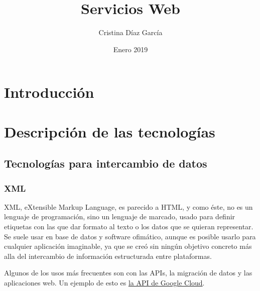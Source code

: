 \documentclass{article}
\title{Servicios Web}
\author{Cristina Díaz García}
\date{Enero 2019}
\begin{document}

\begin{titlingpage}
\maketitle
\end{titlingpage}

\newpage

\tableofcontents

\newpage

\section{Introducción}


\section{Descripción de las tecnologías}

\subsection{Tecnologías para intercambio de datos}

\subsubsection{XML}

XML, eXtensible Markup Language, es parecido a HTML, y como éste, no es un lenguaje de programación, sino un lenguaje de marcado, usado para definir etiquetas con las que dar formato al texto o los datos que se quieran representar. Se suele usar en base de datos y software ofimático, aunque es posible usarlo para cualquier aplicación imaginable, ya que se creó sin ningún objetivo concreto más alla del intercambio de información estructurada entre plataformas.

Algunos de los usos más frecuentes son con las APIs, la migración de datos y las aplicaciones web. Un ejemplo de esto es \href{https://cloud.google.com/storage/docs/xml-api/overview}{la API de Google Cloud}.
\end{document}
